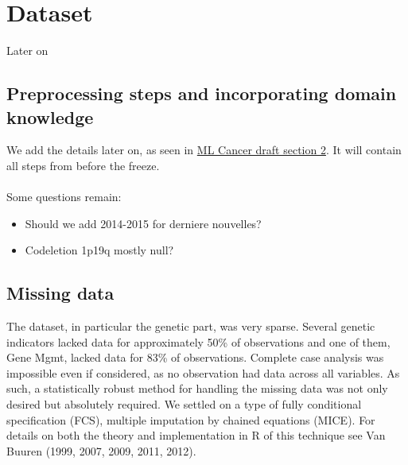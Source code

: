 \documentclass[a4paper]{article}
\begin{document}
%
% 
\section{Dataset}
Later on
\subsection{Preprocessing steps and incorporating domain knowledge}
We add the details later on, as seen in \href{https://docs.google.com/document/d/1JLTCHmSZfeyiXF38ikDNfvlOWVnyi-iYlYuv15HaZW0}{ML Cancer draft section 2}. It will contain all steps from before the freeze. \\
\\
Some questions remain: 
\begin{itemize}
\item Should we add 2014-2015 for derniere nouvelles? 
\item Codeletion 1p19q mostly null? 
\end{itemize}
%
% 
\subsection{Missing data}
The dataset, in particular the genetic part, was very sparse. Several genetic  indicators lacked data for approximately 50\% of observations and one of them, Gene Mgmt, lacked data for 83\% of observations. Complete case analysis was impossible even if considered, as no observation had data across all variables. As such, a statistically robust method for handling the missing data was not only desired but absolutely required. We settled on a type of fully conditional specification (FCS), multiple imputation by chained equations (MICE). 
For details on both the theory and implementation in R of this technique see Van Buuren (1999, 2007, 2009, 2011, 2012).

%
% 
\end{document}
